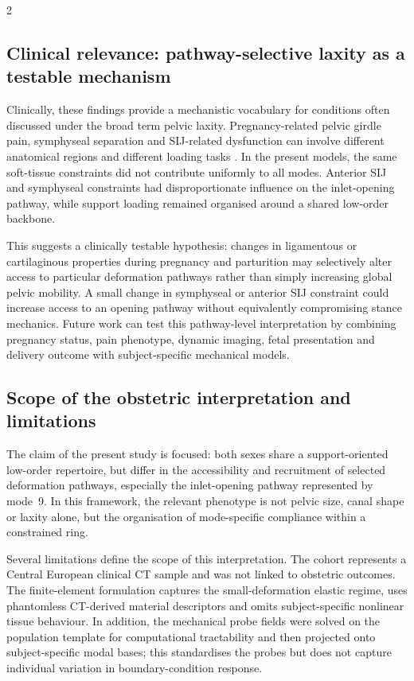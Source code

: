 \documentclass[openacc]{rsproca_new}
\begin{document}
\begin{multicols}{2}
\subsection{Clinical relevance: pathway-selective laxity as a testable mechanism}

Clinically, these findings provide a mechanistic vocabulary for conditions often discussed under the broad term pelvic laxity. Pregnancy-related pelvic girdle pain, symphyseal separation and SIJ-related dysfunction can involve different anatomical regions and different loading tasks \cite{Damen2001,Vleeming2012,Kiapour2019,Stolarczyk2021}. In the present models, the same soft-tissue constraints did not contribute uniformly to all modes. Anterior SIJ and symphyseal constraints had disproportionate influence on the inlet-opening pathway, while support loading remained organised around a shared low-order backbone.

This suggests a clinically testable hypothesis: changes in ligamentous or cartilaginous properties during pregnancy and parturition may selectively alter access to particular deformation pathways rather than simply increasing global pelvic mobility. A small change in symphyseal or anterior SIJ constraint could increase access to an opening pathway without equivalently compromising stance mechanics. Future work can test this pathway-level interpretation by combining pregnancy status, pain phenotype, dynamic imaging, fetal presentation and delivery outcome with subject-specific mechanical models.

\subsection{Scope of the obstetric interpretation and limitations}

The claim of the present study is focused: both sexes share a support-oriented low-order repertoire, but differ in the accessibility and recruitment of selected deformation pathways, especially the inlet-opening pathway represented by mode~9. In this framework, the relevant phenotype is not pelvic size, canal shape or laxity alone, but the organisation of mode-specific compliance within a constrained ring.

Several limitations define the scope of this interpretation. The cohort represents a Central European clinical CT sample and was not linked to obstetric outcomes. The finite-element formulation captures the small-deformation elastic regime, uses phantomless CT-derived material descriptors and omits subject-specific nonlinear tissue behaviour. In addition, the mechanical probe fields were solved on the population template for computational tractability and then projected onto subject-specific modal bases; this standardises the probes but does not capture individual variation in boundary-condition response.


\end{multicols}
\end{document}
